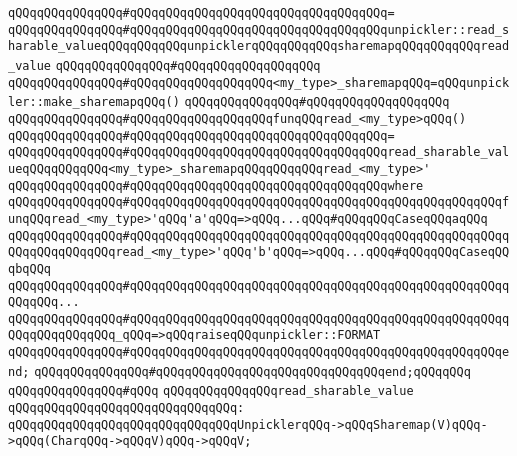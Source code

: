 \verb|qQQqqQQqqQQqqQQq#qQQqqQQqqQQqqQQqqQQqqQQqqQQqqQQqqQQq=|\newline
\verb|qQQqqQQqqQQqqQQq#qQQqqQQqqQQqqQQqqQQqqQQqqQQqqQQqqQQqunpickler::read_sharable_valueqQQqqQQqqQQqunpicklerqQQqqQQqqQQqsharemapqQQqqQQqqQQqread_value|\newline
\verb|qQQqqQQqqQQqqQQq#qQQqqQQqqQQqqQQqqQQq|\newline
\verb|qQQqqQQqqQQqqQQq#qQQqqQQqqQQqqQQqqQQq<my_type>_sharemapqQQq=qQQqunpickler::make_sharemapqQQq()|\newline
\verb|qQQqqQQqqQQqqQQq#qQQqqQQqqQQqqQQqqQQq|\newline
\verb|qQQqqQQqqQQqqQQq#qQQqqQQqqQQqqQQqqQQqfunqQQqread_<my_type>qQQq()|\newline
\verb|qQQqqQQqqQQqqQQq#qQQqqQQqqQQqqQQqqQQqqQQqqQQqqQQqqQQq=|\newline
\verb|qQQqqQQqqQQqqQQq#qQQqqQQqqQQqqQQqqQQqqQQqqQQqqQQqqQQqread_sharable_valueqQQqqQQqqQQq<my_type>_sharemapqQQqqQQqqQQqread_<my_type>'|\newline
\verb|qQQqqQQqqQQqqQQq#qQQqqQQqqQQqqQQqqQQqqQQqqQQqqQQqqQQqwhere|\newline
\verb|qQQqqQQqqQQqqQQq#qQQqqQQqqQQqqQQqqQQqqQQqqQQqqQQqqQQqqQQqqQQqqQQqqQQqfunqQQqread_<my_type>'qQQq'a'qQQq=>qQQq...qQQq#qQQqqQQqCaseqQQqaqQQq|\newline
\verb|qQQqqQQqqQQqqQQq#qQQqqQQqqQQqqQQqqQQqqQQqqQQqqQQqqQQqqQQqqQQqqQQqqQQqqQQqqQQqqQQqqQQqread_<my_type>'qQQq'b'qQQq=>qQQq...qQQq#qQQqqQQqCaseqQQqbqQQq|\newline
\verb|qQQqqQQqqQQqqQQq#qQQqqQQqqQQqqQQqqQQqqQQqqQQqqQQqqQQqqQQqqQQqqQQqqQQqqQQqqQQq...|\newline
\verb|qQQqqQQqqQQqqQQq#qQQqqQQqqQQqqQQqqQQqqQQqqQQqqQQqqQQqqQQqqQQqqQQqqQQqqQQqqQQqqQQqqQQq_qQQq=>qQQqraiseqQQqunpickler::FORMAT|\newline
\verb|qQQqqQQqqQQqqQQq#qQQqqQQqqQQqqQQqqQQqqQQqqQQqqQQqqQQqqQQqqQQqqQQqqQQqend;|\newline
\verb|qQQqqQQqqQQqqQQq#qQQqqQQqqQQqqQQqqQQqqQQqqQQqqQQqend;qQQqqQQq|\newline
\verb|qQQqqQQqqQQqqQQq#qQQq|\newline
\newline
\verb|qQQqqQQqqQQqqQQqread_sharable_value|\newline
\verb|qQQqqQQqqQQqqQQqqQQqqQQqqQQqqQQq:|\newline
\verb|qQQqqQQqqQQqqQQqqQQqqQQqqQQqqQQqUnpicklerqQQq->qQQqSharemap(V)qQQq->qQQq(CharqQQq->qQQqV)qQQq->qQQqV;|\newline
\newline
